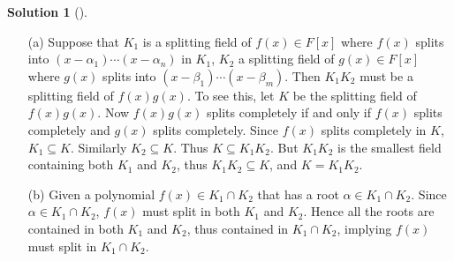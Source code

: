 \documentclass{article}
\theoremstyle{definition}
\newtheorem*{sol}{Solution}
\newenvironment{sols}[1][]{%
  \begin{sol}[#1]$ $\par\nobreak\ignorespaces
}{%
  \end{sol}
}
\begin{document}
\begin{sols}
	\begin{enumerate}
		\item[(a)] Suppose that $K_1$ is a splitting field of $f(x) \in F[x]$ where $f(x)$ splits into $(x - \alpha_1) \cdots (x - \alpha_n)$ in $K_1$, $K_2$ a splitting field of $g(x) \in F[x]$ where $g(x)$ splits into $(x - \beta_1) \cdots (x - \beta_m)$.
			Then $K_1 K_2$ must be a splitting field of $f(x) g(x)$.
			To see this, let $K$ be the splitting field of $f(x) g(x)$.
			Now $f(x) g(x)$ splits completely if and only if $f(x)$ splits completely and $g(x)$ splits completely.
			Since $f(x)$ splits completely in $K$, $K_1 \subseteq K$. 
			Similarly $K_2 \subseteq K$.
			Thus $K \subseteq K_1 K_2$.
			But $K_1 K_2$ is the smallest field containing both $K_1$ and $K_2$, thus $K_1 K_2 \subseteq K$, and $K = K_1 K_2$.
			
		\item[(b)] Given a polynomial $f(x) \in K_1 \cap K_2$ that has a root $\alpha \in K_1 \cap K_2$.
			Since $\alpha \in K_1 \cap K_2$, $f(x)$ must split in both $K_1$ and $K_2$.
			Hence all the roots are contained in both $K_1$ and $K_2$, thus contained in $K_1 \cap K_2$, implying $f(x)$ must split in $K_1 \cap K_2$.
	\end{enumerate}
\end{sols}
\end{document}
